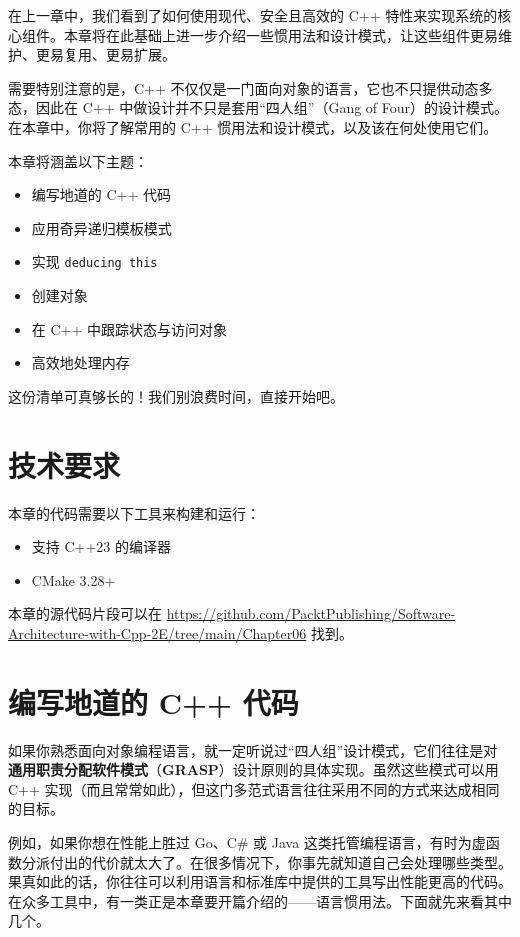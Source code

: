 在上一章中，我们看到了如何使用现代、安全且高效的 C++ 特性来实现系统的核心组件。本章将在此基础上进一步介绍一些惯用法和设计模式，让这些组件更易维护、更易复用、更易扩展。

需要特别注意的是，C++ 不仅仅是一门面向对象的语言，它也不只提供动态多态，因此在 C++ 中做设计并不只是套用“四人组”（Gang of Four）的设计模式。在本章中，你将了解常用的 C++ 惯用法和设计模式，以及该在何处使用它们。

本章将涵盖以下主题：

\begin{itemize}
\item 编写地道的 C++ 代码
\item 应用奇异递归模板模式
\item 实现 \texttt{deducing this}
\item 创建对象
\item 在 C++ 中跟踪状态与访问对象
\item 高效地处理内存
\end{itemize}

这份清单可真够长的！我们别浪费时间，直接开始吧。

\section{技术要求}

本章的代码需要以下工具来构建和运行：

\begin{itemize}
\item 支持 C++23 的编译器
\item CMake 3.28+
\end{itemize}

本章的源代码片段可以在 \href{https://github.com/PacktPublishing/Software-Architecture-with-Cpp-2E/tree/main/Chapter06}{https://github.com/PacktPublishing/Software-Architecture-with-Cpp-2E/tree/main/Chapter06} 找到。

\section{编写地道的 C++ 代码}

\label{idx:511}
\label{idx:512}
如果你熟悉面向对象编程语言，就一定听说过“四人组”设计模式，它们往往是对 \textbf{通用职责分配软件模式}（\textbf{GRASP}）设计原则的具体实现。虽然这些模式可以用 C++ 实现（而且常常如此），但这门多范式语言往往采用不同的方式来达成相同的目标。

例如，如果你想在性能上胜过 Go、C\# 或 Java 这类托管编程语言，有时为虚函数分派付出的代价就太大了。在很多情况下，你事先就知道自己会处理哪些类型。果真如此的话，你往往可以利用语言和标准库中提供的工具写出性能更高的代码。在众多工具中，有一类正是本章要开篇介绍的——语言惯用法。下面就先来看其中几个。

